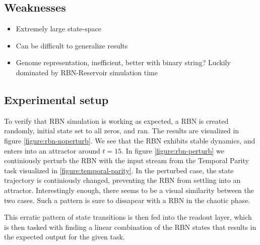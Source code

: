 \subsection{Weaknesses}

\begin{itemize}
  \item Extremely large state-space
  \item Can be difficult to generalize results
  \item
    Genome representation, inefficient, better with binary string?
    Luckily dominated by RBN-Reservoir simulation time
\end{itemize}


\subsection{Experimental setup}

To verify that RBN simulation is working as expected,
a RBN is created randomly, initial state set to all zeros, and ran.
The results are visualized in figure \ref{figure:rbn-noperturb}.
We see that the RBN exhibits stable dynamics, and enters into an attractor around $t=15$.
In figure \ref{figure:rbn-perturb} we continiously perturb the RBN with the input stream from the Temporal Parity task visualized in \ref{figure:temporal-parity}.
In the perturbed case, the state trajectory is continiously changed, preventing the RBN from settling into an attractor.
Interestingly enough, there seems to be a visual similarity between the two cases.
Such a pattern is sure to dissapear with a RBN in the chaotic phase.

This erratic pattern of state transitions is then fed into the readout layer,
which is then tasked with finding a linear combination of the RBN states that results in the expected output for the given task.

